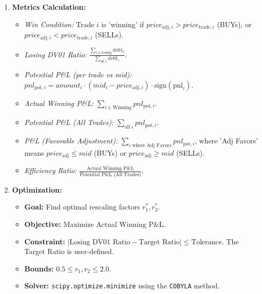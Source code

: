 \documentclass[11pt, a4paper]{article}
\begin{document}
\begin{enumerate}
    \item \textbf{Metrics Calculation:}
        \begin{itemize}[nosep]
            \item \textit{Win Condition:} Trade $i$ is 'winning' if $price_{\text{adj},i} > price_{\text{trade},i}$ (BUYs), or $price_{\text{adj},i} < price_{\text{trade},i}$ (SELLs).
            \item \textit{Losing DV01 Ratio:} $\frac{\sum_{i \in \text{Losing}} dv01_i}{\sum_{\text{all } i} dv01_i}$.
            \item \textit{Potential P\&L (per trade vs mid):} $pnl_{\text{pot},i} = amount_i \cdot (mid_i - price_{\text{adj},i}) \cdot \text{sign}(\text{pnl}_i)$.
            \item \textit{Actual Winning P\&L:} $\sum_{i \in \text{Winning}} pnl_{\text{pot},i}$.
            \item \textit{Potential P\&L (All Trades):} $\sum_{\text{all } i} pnl_{\text{pot},i}$.
            \item \textit{P\&L (Favorable Adjustment):} $\sum_{i \text{ where Adj Favors}} pnl_{\text{pot},i}$, where 'Adj Favors' means $price_{\text{adj}} \le mid$ (BUYs) or $price_{\text{adj}} \ge mid$ (SELLs).
            \item \textit{Efficiency Ratio:} $\frac{\text{Actual Winning P\&L}}{\text{Potential P\&L (All Trades)}}$.
        \end{itemize}

    \item \textbf{Optimization:}
        \begin{itemize}[nosep]
            \item \textbf{Goal:} Find optimal rescaling factors $r_1^*, r_2^*$.
            \item \textbf{Objective:} Maximize Actual Winning P\&L.
            \item \textbf{Constraint:} $| \text{Losing DV01 Ratio} - \text{Target Ratio} | \le \text{Tolerance}$. The Target Ratio is user-defined.
            \item \textbf{Bounds:} $0.5 \le r_1, r_2 \le 2.0$.
            \item \textbf{Solver:} \texttt{scipy.optimize.minimize} using the \texttt{COBYLA} method.
        \end{itemize}


\end{enumerate}
\end{document}
